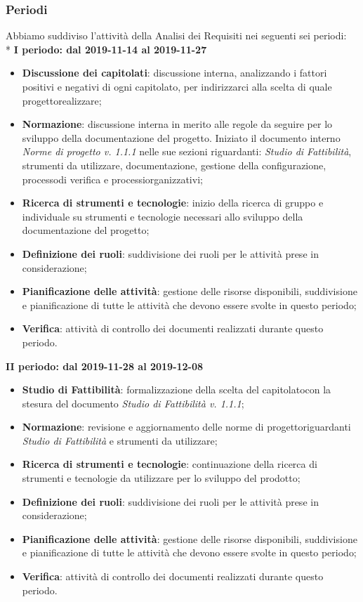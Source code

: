 \subsubsection{Periodi}
Abbiamo suddiviso l'attività della Analisi dei Requisiti nei seguenti sei periodi: \\*
\textbf{I periodo: dal 2019-11-14 al 2019-11-27}
\begin{itemize}
	\item \textbf{Discussione dei capitolati}\glo: discussione interna, analizzando i fattori positivi e negativi di ogni capitolato\glo, per indirizzarci alla scelta di quale progetto\glosp realizzare;
	\item \textbf{Normazione}: discussione interna in merito alle regole da seguire per lo sviluppo della documentazione del progetto\glosp. Iniziato il documento interno \textit{Norme di progetto v. 1.1.1} nelle sue sezioni riguardanti: \textit{Studio di Fattibilità}, strumenti da utilizzare, documentazione, gestione della configurazione, processo\glosp di verifica e processi\glosp organizzativi;
	\item \textbf{Ricerca di strumenti e tecnologie}: inizio della ricerca di gruppo e individuale su strumenti e tecnologie necessari allo sviluppo della documentazione del progetto\glo;
	\item \textbf{Definizione dei ruoli}: suddivisione dei ruoli per le attività prese in considerazione; 
	\item \textbf{Pianificazione delle attività}: gestione delle risorse disponibili, suddivisione e pianificazione di tutte le attività che devono essere svolte in questo periodo;
	\item \textbf{Verifica}: attività di controllo dei documenti realizzati durante questo periodo.
\end{itemize}

\textbf{II periodo: dal 2019-11-28 al 2019-12-08}
\begin{itemize}
	\item \textbf{Studio di Fattibilità}: formalizzazione della scelta del capitolato\glosp con la stesura del documento \textit{Studio di Fattibilità v. 1.1.1};
	\item \textbf{Normazione}: revisione e aggiornamento delle norme di progetto\glosp riguardanti \textit{Studio di Fattibilità} e strumenti da utilizzare;
	\item \textbf{Ricerca di strumenti e tecnologie}: continuazione della ricerca di strumenti e tecnologie da utilizzare per lo sviluppo del prodotto\glo;
	\item \textbf{Definizione dei ruoli}: suddivisione dei ruoli per le attività prese in considerazione; 
	\item \textbf{Pianificazione delle attività}: gestione delle risorse disponibili, suddivisione e pianificazione di tutte le attività che devono essere svolte in questo periodo;
	\item \textbf{Verifica}: attività di controllo dei documenti realizzati durante questo periodo.
\end{itemize}

